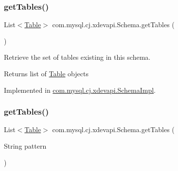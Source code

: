 \mbox{\label{interfacecom_1_1mysql_1_1cj_1_1xdevapi_1_1_schema_a33149bd057a049634d070e97848b8ca1}} 
\subsubsection{\texorpdfstring{get\+Tables()}{getTables()}\hspace{0.1cm}{\footnotesize\ttfamily [1/2]}}
{\footnotesize\ttfamily List$<$\mbox{\hyperlink{interfacecom_1_1mysql_1_1cj_1_1xdevapi_1_1_table}{Table}}$>$ com.\+mysql.\+cj.\+xdevapi.\+Schema.\+get\+Tables (\begin{DoxyParamCaption}{ }\end{DoxyParamCaption})}

Retrieve the set of tables existing in this schema.

\begin{DoxyReturn}{Returns}
list of \mbox{\hyperlink{interfacecom_1_1mysql_1_1cj_1_1xdevapi_1_1_table}{Table}} objects 
\end{DoxyReturn}


Implemented in \mbox{\hyperlink{classcom_1_1mysql_1_1cj_1_1xdevapi_1_1_schema_impl_a437e825fdc3d104e630dda918ccbfa72}{com.\+mysql.\+cj.\+xdevapi.\+Schema\+Impl}}.

\mbox{\label{interfacecom_1_1mysql_1_1cj_1_1xdevapi_1_1_schema_a8d508f1db090e9724dd20ed9375a9b53}} 
\subsubsection{\texorpdfstring{get\+Tables()}{getTables()}\hspace{0.1cm}{\footnotesize\ttfamily [2/2]}}
{\footnotesize\ttfamily List$<$\mbox{\hyperlink{interfacecom_1_1mysql_1_1cj_1_1xdevapi_1_1_table}{Table}}$>$ com.\+mysql.\+cj.\+xdevapi.\+Schema.\+get\+Tables (\begin{DoxyParamCaption}\item[{String}]{pattern }\end{DoxyParamCaption})}

